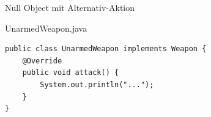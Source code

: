 \begin{frame}[fragile]{Null Object mit Alternativ-Aktion}
	\begin{exampleblock}{UnarmedWeapon.java}
		\begin{lstlisting}
public class UnarmedWeapon implements Weapon {
    @Override
    public void attack() {
        System.out.println("...");
    }
}
		\end{lstlisting}
	\end{exampleblock}
\end{frame}


